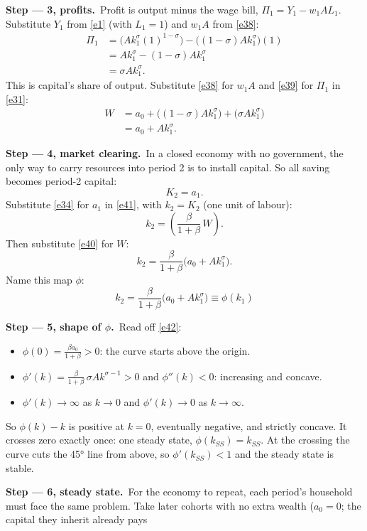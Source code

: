 \documentclass[11pt,a4paper]{article}
\newcommand{\passo}[1]{\par\smallskip\noindent\textbf{Step --- #1.}~}
\begin{document}
\passo{3, profits}Profit is output minus the wage bill, $\Pi_1=Y_1-w_1AL_1$. Substitute $Y_1$ from
\eqref{e1} (with $L_1=1$) and $w_1A$ from \eqref{e38}:
\begin{align}
\Pi_1 &= \big(A k_1^{\sigma}(1)^{1-\sigma}\big)-\big((1-\sigma)A k_1^{\sigma}\big)(1)\nonumber\\
&= A k_1^{\sigma}-(1-\sigma)A k_1^{\sigma}\nonumber\\
&= \sigma A k_1^{\sigma}. \label{e39}
\end{align}
This is capital's share of output. Substitute \eqref{e38} for $w_1A$ and \eqref{e39} for $\Pi_1$ in
\eqref{e31}:
\begin{align}
W &= a_0+\big((1-\sigma)Ak_1^{\sigma}\big)+\big(\sigma Ak_1^{\sigma}\big)\nonumber\\
&= a_0+A k_1^{\sigma}. \label{e40}
\end{align}
\passo{4, market clearing}In a closed economy with no government, the only way to carry resources
into period 2 is to install capital. So all saving becomes period-2 capital:
\begin{equation}
K_2=a_1. \label{e41}
\end{equation}
Substitute \eqref{e34} for $a_1$ in \eqref{e41}, with $k_2=K_2$ (one unit of labour):
\[
k_2=\left(\frac{\beta}{1+\beta}\,W\right).
\]
Then substitute \eqref{e40} for $W$:
\[
k_2=\frac{\beta}{1+\beta}\big(a_0+Ak_1^{\sigma}\big).
\]
Name this map $\phi$:
\begin{equation}
\boxed{k_2=\frac{\beta}{1+\beta}\big(a_0+A k_1^{\sigma}\big)\equiv\phi(k_1)} \label{e42}
\end{equation}
\passo{5, shape of $\phi$}Read off \eqref{e42}:
\begin{itemize}[leftmargin=1.4em]
\item $\phi(0)=\frac{\beta a_0}{1+\beta}>0$: the curve starts above the origin.
\item $\phi'(k)=\frac{\beta}{1+\beta}\,\sigma A k^{\sigma-1}>0$ and $\phi''(k)<0$: increasing and
concave.
\item $\phi'(k)\to\infty$ as $k\to0$ and $\phi'(k)\to0$ as $k\to\infty$.
\end{itemize}
So $\phi(k)-k$ is positive at $k=0$, eventually negative, and strictly concave. It crosses zero
exactly once: one steady state, $\phi(k_{SS})=k_{SS}$. At the crossing the curve cuts the 45° line
from above, so $\phi'(k_{SS})<1$ and the steady state is stable.
\passo{6, steady state}For the economy to repeat, each period's household must face the same
problem. Take later cohorts with no extra wealth ($a_0=0$; the capital they inherit already pays
\end{document}
